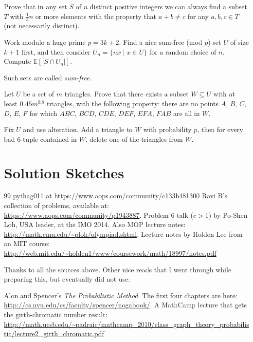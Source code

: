 \documentclass[11pt]{scrartcl}
\newcommand\EE{\mathbb E}
\begin{document}
\begin{problem}
  [Erd\"os] Prove that in any set $S$ of $n$ distinct positive integers
  we can always find a subset $T$ with $\frac 13n$ or more elements
  with the property that $a+b \neq c$ for any $a,b,c \in T$ (not necessarily distinct).
  \begin{sketch}
    Work modulo a huge prime $p=3k+2$.
    Find a nice sum-free (mod $p$) set $U$ of size $k+1$ first,
    and then consider $U_n = \{ nx \mid x \in U \}$ for a random choice of $n$.
    Compute $\EE[\left\lvert S \cap U_n \right\rvert]$.
  \end{sketch}
\end{problem}
\begin{remark*}
  Such sets are called \emph{sum-free}.
\end{remark*}

\begin{problem}
  [Korea 2016]
  Let $U$ be a set of $m$ triangles.
  Prove that there exists a subset $W \subseteq U$
  with at least $0.45 m^{0.8}$ triangles, with the following property:
  there are no points $A$, $B$, $C$, $D$, $E$, $F$
  for which $ABC$, $BCD$, $CDE$, $DEF$, $EFA$, $FAB$ are all in $W$.
  \begin{sketch}
    Fix $U$ and use alteration.
    Add a triangle to $W$ with probability $p$,
    then for every bad $6$-tuple contained in $W$,
    delete one of the triangles from $W$.
  \end{sketch}
\end{problem}

\section{Solution Sketches}


\begin{thebibliography}{99}
   pythag011 at \url{https://www.aops.com/community/c133h481300}
   Ravi B's collection of problems, available at: \\ \url{https://www.aops.com/community/p1943887}.
   Problem 6 talk ($c>1$) by Po-Shen Loh, USA leader, at the IMO 2014.
   Also MOP lecture notes: \url{http://math.cmu.edu/~ploh/olympiad.shtml}.
   Lecture notes by Holden Lee from an MIT course: \\ \url{http://web.mit.edu/~holden1/www/coursework/math/18997/notes.pdf}
\end{thebibliography}
Thanks to all the sources above.
Other nice reads that I went through while preparing this, but eventually did not use:
\begin{enumerate}
  \ii Alon and Spencer's \emph{The Probabilistic Method}. The first four chapters are here: \url{http://cs.nyu.edu/cs/faculty/spencer/nogabook/}.
  \ii A MathCamp lecture that gets the girth-chromatic number result:
  \\ \small \url{http://math.ucsb.edu/~padraic/mathcamp_2010/class_graph_theory_probabilistic/lecture2_girth_chromatic.pdf}
\end{enumerate}
\end{document}

